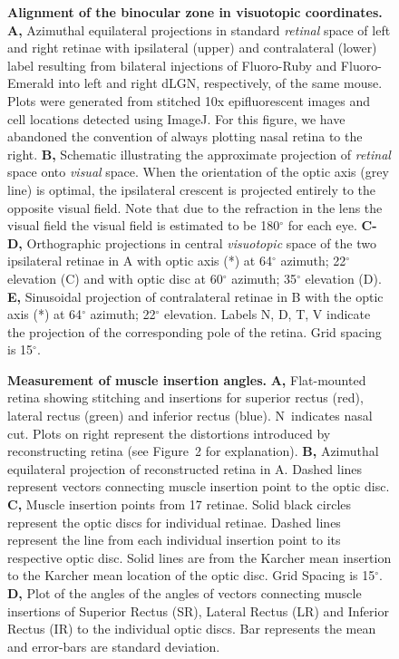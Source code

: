 \documentclass[10pt]{article}
\newcounter{Figure}
\begin{document}
\begin{figure}[!ht]\caption{
\textbf{Alignment of the binocular zone in visuotopic
coordinates.} \textbf{A,} Azimuthal equilateral projections in
standard\textit{ retinal }space of left and right retinae with
ipsilateral (upper) and contralateral (lower) label resulting from
bilateral injections of Fluoro-Ruby and Fluoro-Emerald into left and
right dLGN, respectively, of the same mouse. Plots were generated
from stitched 10x epifluorescent images and cell locations detected
using ImageJ. For this figure, we have abandoned the convention of
always plotting nasal retina to the right. \textbf{B,} Schematic
illustrating the approximate projection of \textit{retinal} space
onto \textit{visual} space. When the orientation of the optic axis
(grey line) is optimal, the ipsilateral crescent is projected
entirely to the opposite visual field. Note that due to the
refraction in the lens the visual field the visual field is estimated
to be 180$^{\circ}$ for each eye. \textbf{C-D,} Orthographic projections
in central \textit{visuotopic} space of the two ipsilateral retinae
in A with optic axis (*) at 64$^{\circ}$ azimuth; 22$^{\circ}$ elevation (C)
and with optic disc at 60$^{\circ}$ azimuth; 35$^{\circ}$ elevation
(D).\textbf{ E,} Sinusoidal projection of contralateral retinae in B
with the optic axis (*) at 64$^{\circ}$ azimuth; 22$^{\circ}$ elevation.
Labels N, D, T, V indicate the projection of the corresponding pole
of the retina. Grid spacing is 15$^{\circ}$.
}\end{figure}

\begin{figure}[!ht]\caption{
\textbf{Measurement of muscle insertion angles.} \textbf{A,}
Flat-mounted retina showing stitching and insertions for superior
rectus (red), lateral rectus (green) and inferior rectus (blue).
N~indicates nasal cut. Plots on right represent the distortions
introduced by reconstructing retina (see Figure~2 for explanation).
\textbf{B,} Azimuthal equilateral projection of reconstructed retina
in A. Dashed lines represent vectors connecting muscle insertion
point to the optic disc. \textbf{C,} Muscle insertion points from 17
retinae. Solid black circles represent the optic discs for individual
retinae. Dashed lines represent the line from each individual
insertion point to its respective optic disc. Solid lines are from
the Karcher mean insertion to the Karcher mean location of the optic
disc. Grid Spacing is 15$^{\circ}$.\textbf{ D,} Plot of the angles of the
angles of vectors connecting muscle insertions of Superior Rectus
(SR), Lateral Rectus (LR) and Inferior Rectus (IR) to the individual
optic discs. Bar represents the mean and error-bars are standard
deviation.
}\end{figure}
\end{document}
